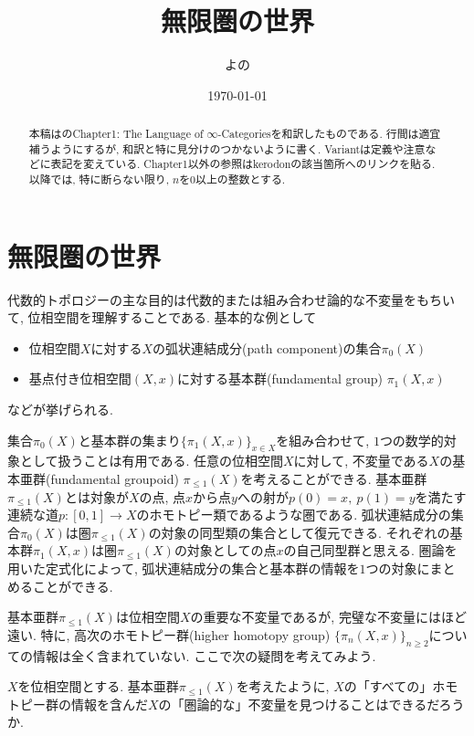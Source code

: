 \documentclass[uplatex, a4paper, 14Q, dvipdfmx]{jsreport}
\title{無限圏の世界}
\author{よの}
\date{\today}
\begin{document}
\maketitle

\begin{abstract}
  本稿は\cite{kerodon}のChapter1: The Language of $\infty$-Categoriesを和訳したものである. 
  行間は適宜補うようにするが, 和訳と特に見分けのつかないように書く. 
  Variantは定義や注意などに表記を変えている. 
  Chapter1以外の参照はkerodonの該当箇所へのリンクを貼る. 
  以降では, 特に断らない限り, $n$を$0$以上の整数とする. 
\end{abstract}

\setcounter{tocdepth}{2}
\tableofcontents

\setcounter{chapter}{0}
\chapter{無限圏の世界}

代数的トポロジーの主な目的は代数的または組み合わせ論的な不変量をもちいて, 位相空間を理解することである. 
基本的な例として
\begin{itemize}
  \item 位相空間$X$に対する$X$の弧状連結成分(path component)の集合$\pi_0(X)$ 
  \item 基点付き位相空間$(X,x)$に対する基本群(fundamental group) $\pi_1(X,x)$ 
\end{itemize}
などが挙げられる. 

集合$\pi_0(X)$と基本群の集まり$\{\pi_1(X,x)\}_{x \in X}$を組み合わせて, $1$つの数学的対象として扱うことは有用である. 
任意の位相空間$X$に対して, 不変量である$X$の基本亜群(fundamental groupoid) $\pi_{\leq 1}(X)$を考えることができる. 
基本亜群$\pi_{\leq 1}(X)$とは対象が$X$の点, 点$x$から点$y$への射が$p(0)=x,~ p(1)=y$を満たす連続な道$p:[0,1] \to X$のホモトピー類であるような圏である.
弧状連結成分の集合$\pi_0(X)$は圏$\pi_{\leq 1}(X)$の対象の同型類の集合として復元できる. 
それぞれの基本群$\pi_1(X,x)$は圏$\pi_{\leq 1}(X)$の対象としての点$x$の自己同型群と思える. 
圏論を用いた定式化によって, 弧状連結成分の集合と基本群の情報を$1$つの対象にまとめることができる.

基本亜群$\pi_{\leq 1}(X)$は位相空間$X$の重要な不変量であるが, 完璧な不変量にはほど遠い. 
特に, 高次のホモトピー群(higher homotopy group) $\{\pi_n(X,x)\}_{n \geq 2}$についての情報は全く含まれていない. 
ここで次の疑問を考えてみよう. 

\begin{que}
  $X$を位相空間とする. 
  基本亜群$\pi_{\leq 1}(X)$を考えたように, $X$の「すべての」ホモトピー群の情報を含んだ$X$の「圏論的な」不変量を見つけることはできるだろうか. 
\end{que}  
\end{document}
